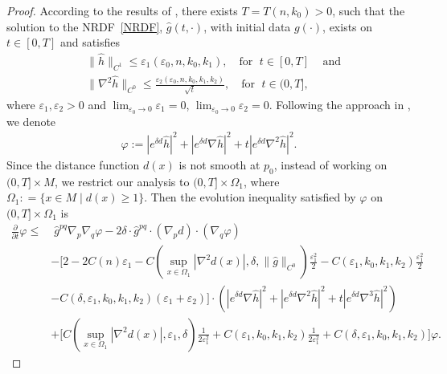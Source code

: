 \documentclass[12pt]{amsart}
\begin{document}
\begin{proof}
 According to the results of \cite{Sh1989, Si2002}, there exists $T = T(n, k_0) > 0$, such that the solution to the NRDF~\eqref{NRDF}, $\hat{g}(t,\cdot)$, with initial data $g(\cdot)$,  exists on $t \in [0, T]$ and satisfies 
\begin{equation}\label{extra2}
    \begin{split}
        &\|\hat{h}\|_{C^{1}} \leq \varepsilon_1(\varepsilon_0, n, k_0, k_1),\quad \text{for }\; t\in [0, T]\;\;\; \text{ and} \\
        &\|\nabla^{2}\hat{h}\|_{C^{0}} \leq \frac{\varepsilon_2(\varepsilon_0, n, k_0, k_1, k_2)}{\sqrt{t}},\quad \text{for }\; t\in (0, T],
    \end{split}
\end{equation}
where $\varepsilon_1, \varepsilon_2 > 0$ and $\lim_{\varepsilon_0\rightarrow 0} \varepsilon_1 = 0$, $\lim_{\varepsilon_0 \rightarrow 0} \varepsilon_2 = 0$. Following the approach in \cite{HJS2016,QSW2013}, we denote
\begin{align}
    \varphi := |e^{\delta d} \hat{h}|^2 + |e^{\delta d}\nabla \hat{h}|^2 + t|e^{\delta d}\nabla^2 \hat{h}|^2.
\end{align}
Since the distance function $d(x)$ is not smooth at $p_0$, instead of working on $(0, T]\times M$, we restrict our analysis to $(0, T]\times \Omega_1$, where $\Omega_{1}: = \{x\in M\;|\; d(x) \geq 1\}$. Then the evolution inequality satisfied by $\varphi$ on $(0, T]\times \Omega_1$ is
\begin{equation}
    \begin{split}
        \frac{\partial}{\partial t} \varphi 
        \leq&\; \hat{g}^{pq} \nabla_p \nabla_q \varphi - 2\delta\cdot \hat{g}^{pq}\cdot (\nabla_p d)\cdot (\nabla_q \varphi)\\
        &-\bigg[2 - 2C(n)\varepsilon_1 - C(\sup_{x\in \Omega_1}|\nabla^2 d(x)|, \delta, \|\hat{g}\|_{C^0})\frac{\varepsilon_1^2}{2} - C(\varepsilon_1, k_0, k_1, k_2)\frac{\varepsilon_1^2}{2}\\
        &-C(\delta, \varepsilon_1, k_0, k_1, k_2)(\varepsilon_1 + \varepsilon_2)\bigg]\cdot (|e^{\delta d}\nabla \hat{h}|^2 + |e^{\delta d}\nabla^2 \hat{h}|^2 + t|e^{\delta d}\nabla^3\hat{h}|^2)\\
        &+\bigg[ C(\sup_{x\in\Omega_{1}}|\nabla^2 d(x)|, \varepsilon_1, \delta)\frac{1}{2\varepsilon_1^2} + C(\varepsilon_1, k_0, k_1, k_2)\frac{1}{2\varepsilon_1^2} + C(\delta, \varepsilon_1, k_0, k_1, k_2) \bigg] \varphi.
    \end{split}

\end{equation}
\end{proof}
\end{document}
